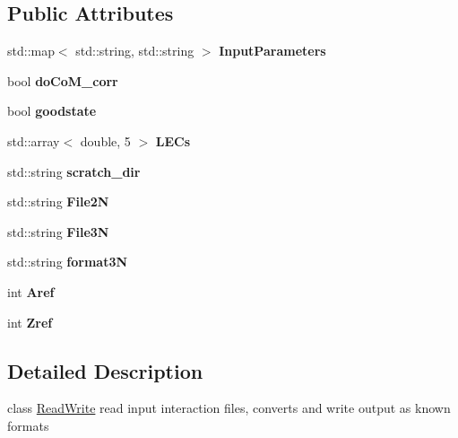 \subsection*{Public Attributes}
\begin{DoxyCompactItemize}
\item 
\mbox{\label{classReadWrite_a3185e2d55e83fcef60ce6503b532a317}} 
std\+::map$<$ std\+::string, std\+::string $>$ {\bfseries Input\+Parameters}
\item 
\mbox{\label{classReadWrite_a3221f4b824dc385b066eca732339ee72}} 
bool {\bfseries do\+Co\+M\+\_\+corr}
\item 
\mbox{\label{classReadWrite_aaf2753e15a5e7f524d6fde9f15ab357b}} 
bool {\bfseries goodstate}
\item 
\mbox{\label{classReadWrite_a0adff097ed834bf7b3d198440551229d}} 
std\+::array$<$ double, 5 $>$ {\bfseries L\+E\+Cs}
\item 
\mbox{\label{classReadWrite_ab1360cba72bf9eff52ef50450e7cbeea}} 
std\+::string {\bfseries scratch\+\_\+dir}
\item 
\mbox{\label{classReadWrite_a214986ceebcb2d0f0024473529cb0983}} 
std\+::string {\bfseries File2N}
\item 
\mbox{\label{classReadWrite_aef25f9b501f064cda6afa801714d2635}} 
std\+::string {\bfseries File3N}
\item 
\mbox{\label{classReadWrite_af34878f4a893d1b5f16bdd5488dea9b9}} 
std\+::string {\bfseries format3N}
\item 
\mbox{\label{classReadWrite_aca5f0cb236385d203bee1161f36d13a4}} 
int {\bfseries Aref}
\item 
\mbox{\label{classReadWrite_a1d6ac500b2e1e8f76c8df799a114120f}} 
int {\bfseries Zref}
\end{DoxyCompactItemize}


\subsection{Detailed Description}
class \hyperlink{classReadWrite}{Read\+Write} read input interaction files, converts and write output as known formats 

